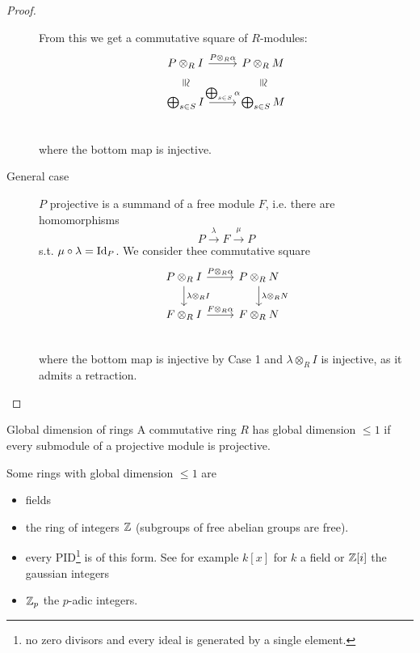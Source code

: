 \documentclass[language=english]{TemplateLecture}
\begin{document}
\begin{proof}
\begin{description}
        From this we get a commutative square of \(R\)-modules:
        \[\begin{tikzcd}
            P\otimes_R I \ar[d, "\cong", sloped, phantom] \ar[r, "P\otimes_R \alpha"] & P\otimes_R M \ar[d, "\cong", phantom, sloped] \\
            \bigoplus_{s\in S} I \ar[r, "\bigoplus_{s \in S} \alpha"] & \bigoplus_{s \in S} M \\
        \end{tikzcd}\]
        where the bottom map is injective.
        \item[General case] \(P\) projective is a summand of a free module \(F\), i.e. there are homomorphisms
        \[P \xrightarrow{\lambda} F \xrightarrow{\mu} P\]
        s.t. \(\mu\circ \lambda = \operatorname{Id}_P\). We consider thee commutative square
        \[\begin{tikzcd}
            P\otimes_R I \ar[d, "\lambda\otimes_R I"]\ar[r, "P\otimes_R \alpha"] & P\otimes_R N \ar[d, "\lambda\otimes_R N"]\\
            F \otimes_R I \ar["F \otimes_R \alpha", r] & F\otimes_R N \\
        \end{tikzcd}\]
        where the bottom map is injective by Case 1 and \(\lambda \otimes_R I\) is injective, as it admits a retraction.
    \end{description}
\end{proof}

\begin{defi}{Global dimension of rings}{}
    A commutative ring \(R\) has global dimension \(\leq 1\) if every submodule of a projective module is projective.
\end{defi}

\begin{example} Some rings with global dimension \(\leq 1\) are
    \begin{itemize}
        \item fields 
        \item the ring of integers \(\mathbb{Z}\) (subgroups of free abelian groups are free).
        \item every PID\footnote{no zero divisors and every ideal is generated by a single element.} is of this form. See for example \(k[x]\) for \(k\) a field or \(\mathbb{Z}[i]\) the gaussian integers
        \item \(\mathbb{Z}_p\) the \(p\)-adic integers.
    \end{itemize}
\end{example}
\end{document}

